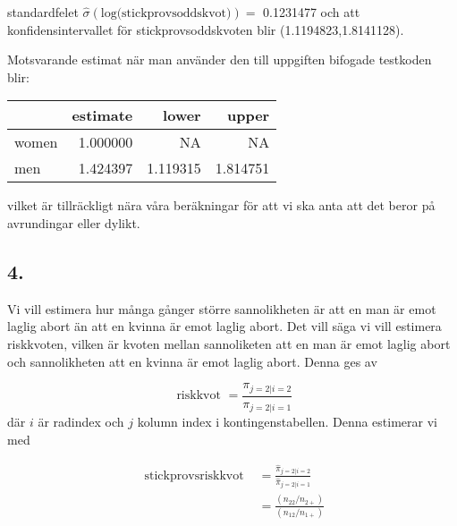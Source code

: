 \documentclass[]{article}
\newenvironment{Shaded}{\begin{snugshade}}{\end{snugshade}}
\newcommand{\CommentTok}[1]{\textcolor[rgb]{0.56,0.35,0.01}{\textit{#1}}}
\newcommand{\DataTypeTok}[1]{\textcolor[rgb]{0.13,0.29,0.53}{#1}}
\newcommand{\KeywordTok}[1]{\textcolor[rgb]{0.13,0.29,0.53}{\textbf{#1}}}
\newcommand{\NormalTok}[1]{#1}
\newcommand{\OperatorTok}[1]{\textcolor[rgb]{0.81,0.36,0.00}{\textbf{#1}}}
\newcommand{\StringTok}[1]{\textcolor[rgb]{0.31,0.60,0.02}{#1}}
\begin{document}
standardfelet \(\widehat{\sigma}(\text{log(stickprovsoddskvot)}) =\)
0.1231477 och att konfidensintervallet för stickprovsoddskvoten blir
(1.1194823,1.8141128).

Motsvarande estimat när man använder den till uppgiften bifogade
testkoden blir:

\begin{Shaded}
\end{Shaded}

\begin{longtable}[]{@{}lrrr@{}}
\toprule
& estimate & lower & upper\tabularnewline
\midrule
\endhead
women & 1.000000 & NA & NA\tabularnewline
men & 1.424397 & 1.119315 & 1.814751\tabularnewline
\bottomrule
\end{longtable}

vilket är tillräckligt nära våra beräkningar för att vi ska anta att det
beror på avrundingar eller dylikt.

\hypertarget{section-2}{%
\subsection{4.}\label{section-2}}

Vi vill estimera hur många gånger större sannolikheten är att en man är
emot laglig abort än att en kvinna är emot laglig abort. Det vill säga
vi vill estimera riskkvoten, vilken är kvoten mellan sannoliketen att en
man är emot laglig abort och sannolikheten att en kvinna är emot laglig
abort. Denna ges av

\[
\text{ riskkvot } = \frac{\pi_{j = 2|i = 2}}{\pi_{j = 2|i = 1}}
\] där \(i\) är radindex och \(j\) kolumn index i kontingenstabellen.
Denna estimerar vi med

\[
\begin{aligned}
\text{ stickprovsriskkvot } &= \frac{\widehat{\pi}_{j = 2|i = 2}}{\widehat{\pi}_{j = 2|i = 1}}\\
&= \frac{(n_{22}/n_{2+})}{(n_{12}/n_{1+})}
\end{aligned}
\]
\end{document}
